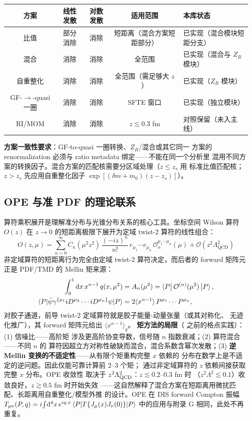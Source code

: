 \documentclass[11pt,a4paper]{ctexart}
\newcommand{\LaMET}{\text{LaMET}}
\newcommand{\order}[1]{\mathcal{O}(#1)}
\begin{document}
\begin{center}
\small
\begin{tabular}{c c c c l}
\toprule
\textbf{方案} & \textbf{线性发散} & \textbf{对数发散} & \textbf{适用范围} &
\textbf{本库状态} \\
\midrule
比值 & 部分消除 & 消除 & 短距离（混合方案短距部分） & 已实现（混合模块短距分支） \\
混合 & 消除 & 消除 & 全范围 & 已实现（混合与 $Z_R$ 模块） \\
自重整化 & 消除 & 消除 & 全范围（需足够大 $z$） & 已实现（$Z_R$ 模块） \\
GF-$\to$-quasi 一圈 & 消除 & 消除 & SFTE 窗口 & 已实现（独立模块） \\
RI/MOM & 消除 & 消除 & $z\lesssim0.3$ fm & 对照保留（未入主线） \\
\bottomrule
\end{tabular}
\end{center}
\textbf{方案一致性要求}：GF-to-quasi 一圈转换、$Z_R$/混合或其它同一
方案的 renormalization 必须与 ratio metadata 绑定——不能在同一个分析里
混用不同方案的转换因子。混合方案的匹配核需要分区域处理（$z\le z_s$ 用
标准比值匹配核；$z>z_s$ 先应用自重整化因子
$\exp[(\delta m+m_0)(z-z_s)]$）。

\subsection{OPE 与准 PDF 的理论联系}

算符乘积展开是理解准分布与光锥分布关系的核心工具。坐标空间 Wilson 算符
$O(z)$ 在 $z\to0$ 的短距离极限下展开为定域 twist-2 算符的线性组合：
\begin{equation}
O(z,\mu) = \sum_{n=0}^{\infty} C_n(\mu^2 z^2)\,\frac{(-iz)^n}{n!}\,
e_{\mu_1}\cdots e_{\mu_n}\,\mathcal{O}_n^{\mu_1\cdots\mu_n}(\mu)
+ \order{z^2\Lambda_{\text{QCD}}^2}
\end{equation}
非定域算符的短距离行为完全由定域 twist-2 算符决定，而后者的 forward
矩阵元正是 PDF/TMD 的 Mellin 矩来源：
\begin{align}
\int_0^1 \mathrm{d}x\, x^{n-1}\,q(x,\mu^2) &= A_n(\mu^2)
= \braket{P\bigl|\,\mathcal{O}^{(n)}(\mu^2)\,\bigr|P}, \notag\\
\braket{P|\bar\psi\gamma^{\{\mu_1} iD^{\mu_2}\cdots iD^{\mu_n\}}\psi|P}
&= 2\langle x^{n-1}\rangle\,P^{\mu_1}\cdots P^{\mu_n},
\end{align}
对胶子通道，前导 twist-2 定域算符就是胶子能量-动量张量（或其对称化、
无迹化推广），其 forward 矩阵元给出 $\langle x^{n-1}\rangle_g$。
\textbf{矩方法的局限}（\LaMET{} 之前的格点实践）：(1) 信噪比——高阶矩
涉及更高阶协变导数，信号随 $n$ 指数衰减；(2) 算符混合——不同 $n$ 的
算符因超立方对称性破缺而混合，混合系数含幂次发散；(3)
\textbf{逆 Mellin 变换的不适定性}——从有限个矩重构完整 $x$ 依赖的
分布在数学上是不适定的逆问题。因此仅能可靠计算前 2--3 个矩；
\LaMET{} 通过非定域算符的 $z$ 依赖间接获取完整 $x$ 分布。OPE 收敛性
取决于 $z^2\Lambda_{\rm QCD}^2$：$z\lesssim0.2$--$0.3$ fm 时
（$z^2\Lambda^2\lesssim0.1$）收敛良好，$z\gtrsim0.5$ fm 时开始失效
——这自然解释了混合方案在短距离用微扰匹配、长距离用自重整化/模型外推
的设计。OPE 在 DIS forward Compton 振幅
$T_{\mu\nu}(P,q)=i\!\int\!\mathrm{d}^4x\,e^{iq\cdot x}
\braket{P|T\{J_\mu(x)J_\nu(0)\}|P}$ 中的应用与附录 G 相同，此处不再
重复。
\end{document}
